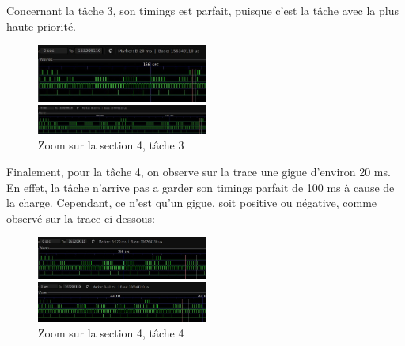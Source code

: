\documentclass[11pt, a4paper]{article}
\begin{document}
Concernant la tâche 3, son timings est parfait, puisque c'est la tâche avec la plus haute priorité.

\begin{figure}[H]
    \begin{multicols}{2}
        \begin{center}
            \includegraphics[width=0.5\textwidth]{section4_send_t3_load_1}
        \end{center}
        \columnbreak
        \begin{center}
            \includegraphics[width=0.5\textwidth]{section4_send_t3_load_2}
        \end{center}
    \end{multicols}
    \caption{Zoom sur la section 4, tâche 3}
    \label{Zoom sur la section 4, tâche 3}
\end{figure}

Finalement, pour la tâche 4, on observe sur la trace une gigue d'environ 20 ms.
En effet, la tâche n'arrive pas a garder son timings parfait de 100 ms à cause de la charge.
Cependant, ce n'est qu'un gigue, soit positive ou négative, comme observé sur la trace ci-dessous:

\begin{figure}[H]
    \begin{multicols}{2}
        \begin{center}
            \includegraphics[width=0.5\textwidth]{section4_send_t4_leds_2}
        \end{center}
        \columnbreak
        \begin{center}
            \includegraphics[width=0.5\textwidth]{section4_send_t4_leds_3}
        \end{center}
    \end{multicols}
    \caption{Zoom sur la section 4, tâche 4}
    \label{Zoom sur la section 4, tâche 4}
\end{figure}
\end{document}
